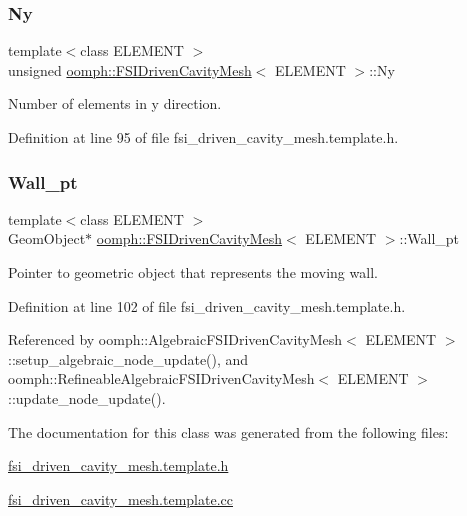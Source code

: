 \subsubsection{\texorpdfstring{Ny}{Ny}}
{\footnotesize\ttfamily template$<$class E\+L\+E\+M\+E\+NT $>$ \\
unsigned \hyperlink{classoomph_1_1FSIDrivenCavityMesh}{oomph\+::\+F\+S\+I\+Driven\+Cavity\+Mesh}$<$ E\+L\+E\+M\+E\+NT $>$\+::Ny\hspace{0.3cm}{\ttfamily [protected]}}



Number of elements in y direction. 



Definition at line 95 of file fsi\+\_\+driven\+\_\+cavity\+\_\+mesh.\+template.\+h.

\mbox{\label{classoomph_1_1FSIDrivenCavityMesh_a4f05e03a223ac1f8370bdd39c56a5638}} 
\subsubsection{\texorpdfstring{Wall\+\_\+pt}{Wall\_pt}}
{\footnotesize\ttfamily template$<$class E\+L\+E\+M\+E\+NT $>$ \\
Geom\+Object$\ast$ \hyperlink{classoomph_1_1FSIDrivenCavityMesh}{oomph\+::\+F\+S\+I\+Driven\+Cavity\+Mesh}$<$ E\+L\+E\+M\+E\+NT $>$\+::Wall\+\_\+pt\hspace{0.3cm}{\ttfamily [protected]}}



Pointer to geometric object that represents the moving wall. 



Definition at line 102 of file fsi\+\_\+driven\+\_\+cavity\+\_\+mesh.\+template.\+h.



Referenced by oomph\+::\+Algebraic\+F\+S\+I\+Driven\+Cavity\+Mesh$<$ E\+L\+E\+M\+E\+N\+T $>$\+::setup\+\_\+algebraic\+\_\+node\+\_\+update(), and oomph\+::\+Refineable\+Algebraic\+F\+S\+I\+Driven\+Cavity\+Mesh$<$ E\+L\+E\+M\+E\+N\+T $>$\+::update\+\_\+node\+\_\+update().



The documentation for this class was generated from the following files\+:\begin{DoxyCompactItemize}
\item 
\hyperlink{fsi__driven__cavity__mesh_8template_8h}{fsi\+\_\+driven\+\_\+cavity\+\_\+mesh.\+template.\+h}\item 
\hyperlink{fsi__driven__cavity__mesh_8template_8cc}{fsi\+\_\+driven\+\_\+cavity\+\_\+mesh.\+template.\+cc}\end{DoxyCompactItemize}

